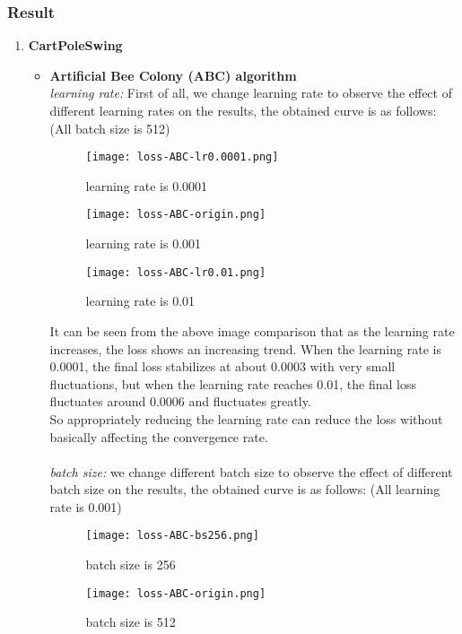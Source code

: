 \documentclass[12pt]{article}
\begin{document}
\subsubsection{Result}
\begin{enumerate}
  \item \textbf{CartPoleSwing}
  \begin{itemize}
    \item \textbf{ Artificial Bee Colony (ABC) algorithm} \\
    \textit{learning rate:} First of all, we change learning rate to observe the effect of different learning rates on the results, the obtained curve is as follows: (All batch size is 512)
    \begin{figure}[H]
      \centering
      \texttt{[image: loss-ABC-lr0.0001.png]}
      \caption{learning rate is 0.0001}
    \end{figure}
    
    \begin{figure}[H]
      \centering
      \texttt{[image: loss-ABC-origin.png]}
      \caption{learning rate is 0.001}
    \end{figure}

    \begin{figure}[H]
      \centering
      \texttt{[image: loss-ABC-lr0.01.png]}
      \caption{learning rate is 0.01}
    \end{figure}
    It can be seen from the above image comparison that as the learning rate increases, the loss shows an increasing trend. 
    When the learning rate is 0.0001, the final loss stabilizes at about 0.0003 with very small fluctuations, 
    but when the learning rate reaches 0.01, the final loss fluctuates around 0.0006 and fluctuates greatly.\\
    So appropriately reducing the learning rate can reduce the loss without basically affecting the convergence rate.\\
    ~\\
    \textit{batch size:} we change different batch size to observe the effect of different batch size on the results, the obtained curve is as follows: (All learning rate is 0.001)
    \begin{figure}[H]
      \centering
      \texttt{[image: loss-ABC-bs256.png]}
      \caption{batch size is 256}
    \end{figure}
    
    \begin{figure}[H]
      \centering
      \texttt{[image: loss-ABC-origin.png]}
      \caption{batch size is 512}
    \end{figure}


\end{itemize}
\end{enumerate}
\end{document}
